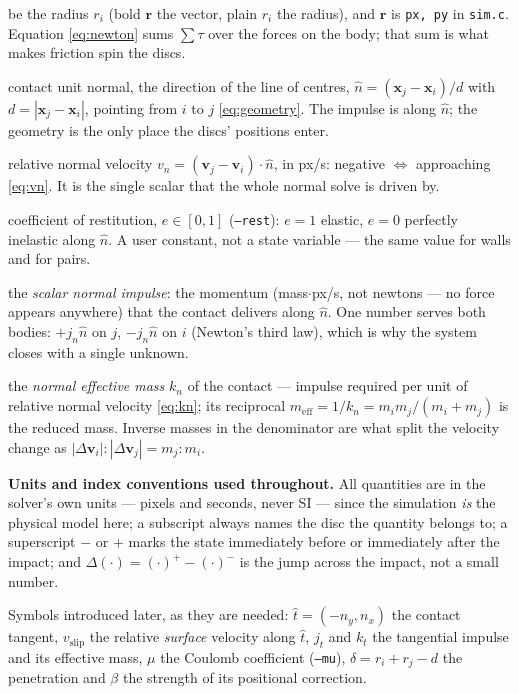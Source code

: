 \documentclass[a4paper,11pt]{article}
\newcommand{\x}{\bm{x}}
\newcommand{\vV}{\bm{v}}
\newcommand{\hh}{\hat{n}}
\newcommand{\ttt}{\hat{t}}
\newcommand{\rr}{\bm{r}}          %
\begin{document}
\begin{description}[style=sameline, itemsep=3pt,
                    labelwidth=*, labelindent=1.8em, leftmargin=!,
                    rightmargin=2.4em]
    be the radius $r_i$ (bold $\rr$ the vector, plain $r_i$ the radius), and
    $\rr$ is \texttt{px, py} in \texttt{sim.c}. Equation \eqref{eq:newton} sums
    $\sum\tau$ over the forces on the body; that sum is what makes friction spin
    the discs.
  \item[$\hh$] contact unit normal, the direction of the line of centres,
    $\hh=(\x_j-\x_i)/d$ with $d=|\x_j-\x_i|$, pointing from $i$ to $j$
    \eqref{eq:geometry}. The impulse is along $\hh$; the geometry is the only
    place the discs' positions enter.
  \item[$v_n$] relative normal velocity $v_n=(\vV_j-\vV_i)\cdot\hh$, in px/s:
    negative $\Longleftrightarrow$ approaching \eqref{eq:vn}. It is the single
    scalar that the whole normal solve is driven by.
  \item[$e$] coefficient of restitution, $e\in[0,1]$ (\texttt{--rest}): $e=1$
    elastic, $e=0$ perfectly inelastic along $\hh$. A user constant, not a state
    variable --- the same value for walls and for pairs.
  \item[$j_n$] the \emph{scalar normal impulse}: the momentum (mass$\cdot$px/s,
    not newtons --- no force appears anywhere) that the contact delivers along
    $\hh$. One number serves both bodies: $+j_n\hh$ on $j$, $-j_n\hh$ on $i$
    (Newton's third law), which is why the system closes with a single unknown.
  \item[$1/m_i+\dfrac{1}{m_j}$] the \emph{normal effective mass} $k_n$ of the
    contact --- impulse required per unit of relative normal velocity
    \eqref{eq:kn}; its reciprocal $m_{\text{eff}}=1/k_n= m_im_j/(m_i+m_j)$ is
    the reduced mass. Inverse masses in the denominator are what split the
    velocity change as $|\Delta\vV_i|:|\Delta\vV_j|=m_j:m_i$.
\end{description}

\noindent
\textbf{Units and index conventions used throughout.} All quantities are in the
solver's own units --- pixels and seconds, never SI --- since the simulation
\emph{is} the physical model here; a subscript always names the disc the
quantity belongs to; a superscript $-$ or $+$ marks the state immediately
before or immediately after the impact; and $\Delta(\cdot)=(\cdot)^{+}-(\cdot)^{-}$
is the jump across the impact, not a small number.

Symbols introduced later, as they are needed: $\ttt=(-n_y,n_x)$ the contact
tangent, $v_{\text{slip}}$ the relative \emph{surface} velocity along $\ttt$,
$j_t$ and $k_t$ the tangential impulse and its effective mass, $\mu$ the Coulomb
coefficient (\texttt{--mu}), $\delta=r_i+r_j-d$ the penetration and $\beta$ the
strength of its positional correction.
\end{document}
